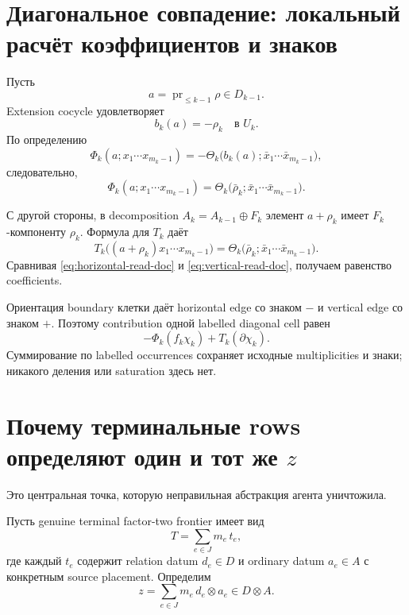 \documentclass[11pt,a4paper]{article}
\theoremstyle{definition}
\theoremstyle{remark}
\newcommand{\pr}{\operatorname{pr}}
\begin{document}
\section{Диагональное совпадение: локальный расчёт коэффициентов и знаков}

Пусть
\[
 a=\pr_{\le k-1}\rho\in D_{k-1}.
\]
Extension cocycle удовлетворяет
\[
 b_k(a)=-\rho_k\quad\text{в }U_k.
\]
По определению
\[
 \Phi_k(a;x_1\cdots x_{m_k-1})
 =-\Theta_k\bigl(b_k(a);\bar x_1\cdots\bar x_{m_k-1}\bigr),
\]
следовательно,
\begin{equation}\label{eq:horizontal-read-doc}
 \Phi_k(a;x_1\cdots x_{m_k-1})
 =\Theta_k\bigl(\bar\rho_k;\bar x_1\cdots\bar x_{m_k-1}\bigr).
\end{equation}

С другой стороны, в decomposition $A_k=A_{k-1}\oplus F_k$ элемент
$a+\rho_k$ имеет $F_k$-компоненту $\rho_k$. Формула для $T_k$ даёт
\begin{equation}\label{eq:vertical-read-doc}
 T_k\bigl((a+\rho_k)x_1\cdots x_{m_k-1}\bigr)
 =\Theta_k\bigl(\bar\rho_k;\bar x_1\cdots\bar x_{m_k-1}\bigr).
\end{equation}
Сравнивая \eqref{eq:horizontal-read-doc} и
\eqref{eq:vertical-read-doc}, получаем равенство coefficients.

Ориентация boundary клетки даёт horizontal edge со знаком $-$ и vertical
edge со знаком $+$. Поэтому contribution одной labelled diagonal cell равен
\begin{equation}\label{eq:diagonal-contribution-doc}
 -\Phi_k(f_k\chi_k)+T_k(\partial\chi_k).
\end{equation}
Суммирование по labelled occurrences сохраняет исходные multiplicities и
знаки; никакого деления или saturation здесь нет.

\section{Почему терминальные rows определяют один и тот же $z$}

Это центральная точка, которую неправильная абстракция агента уничтожила.

Пусть genuine terminal factor-two frontier имеет вид
\[
 T=\sum_{e\in J}m_e\,t_e,
\]
где каждый $t_e$ содержит relation datum $d_e\in D$ и ordinary datum
$a_e\in A$ с конкретным source placement. Определим
\begin{equation}\label{eq:z-definition}
 z=\sum_{e\in J}m_e\,d_e\otimes a_e\in D\otimes A.
\end{equation}
\end{document}
